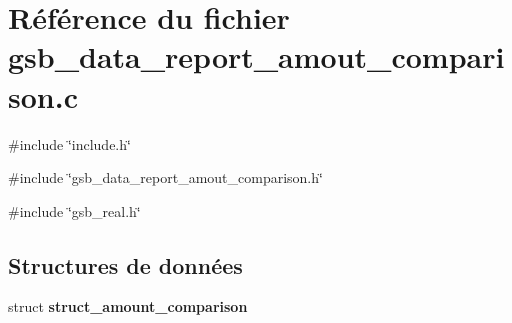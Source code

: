 \section{Référence du fichier gsb\_\-data\_\-report\_\-amout\_\-comparison.c}
\label{gsb__data__report__amout__comparison_8c}
{\ttfamily \#include \char`\"{}include.h\char`\"{}}\par
{\ttfamily \#include \char`\"{}gsb\_\-data\_\-report\_\-amout\_\-comparison.h\char`\"{}}\par
{\ttfamily \#include \char`\"{}gsb\_\-real.h\char`\"{}}\par
\subsection*{Structures de données}
\begin{DoxyCompactItemize}
\item 
struct {\bf struct\_\-amount\_\-comparison}
\end{DoxyCompactItemize}
